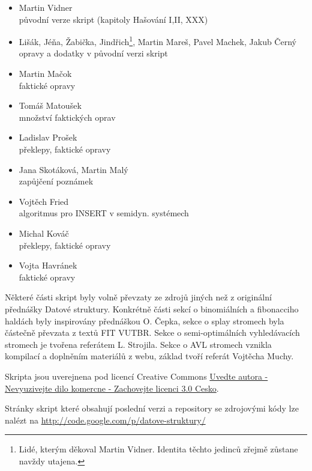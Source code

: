 \documentclass[a4paper]{report}
\theoremstyle{definition}
\begin{document}
\begin{itemize}
  \item Martin Vidner \\ 
  	původní verze skript (kapitoly Hašování I,II, XXX)
  \item Lišák, Jéňa, Žabička, Jindřich\footnote{Lidé, kterým děkoval
  	Martin Vidner. Identita těchto jedinců zřejmě zůstane navždy
	utajena.}, 
  	Martin Mareš, Pavel Machek, Jakub Černý \\
	opravy a dodatky v původní verzi skript
  \item Martin Mačok \\
  	faktické opravy
  \item Tomáš Matoušek \\
  	množství faktických oprav
  \item Ladislav Prošek \\
  	překlepy, faktické opravy
  \item Jana Skotáková, Martin Malý \\
  	zapůjčení poznámek
  \item Vojtěch Fried \\
  	algoritmus pro INSERT v semidyn. systémech
  \item Michal Kováč \\
  	překlepy, faktické opravy
  \item Vojta Havránek \\
  	faktické opravy
\end{itemize}


Některé části skript byly volně převzaty ze zdrojů jiných než z 
originální přednášky Datové struktury. Konkrétně části sekcí o
binomiálních a fibonacciho haldách byly inspirovány přednáškou O. Čepka,
sekce o splay stromech byla částečně převzata z textů FIT VUTBR.
Sekce o semi-optimálních vyhledávacích stromech je tvořena referátem L.
Strojila. Sekce o AVL stromech vznikla kompilací a doplněním materiálů z
webu, základ tvoří referát Vojtěcha Muchy.

Skripta jsou uverejnena pod licencí Creative Commons
\href{http://creativecommons.org/licenses/by-nc-sa/3.0/cz/}{Uvedte
autora - Nevyuzivejte dilo komercne - Zachovejte licenci 3.0 Cesko}.

Stránky skript které obsahují poslední verzi a repository se zdrojovými
kódy lze nalézt na \href{http://code.google.com/p/datove-struktury/}{http://code.google.com/p/datove-struktury/}
\end{document}
